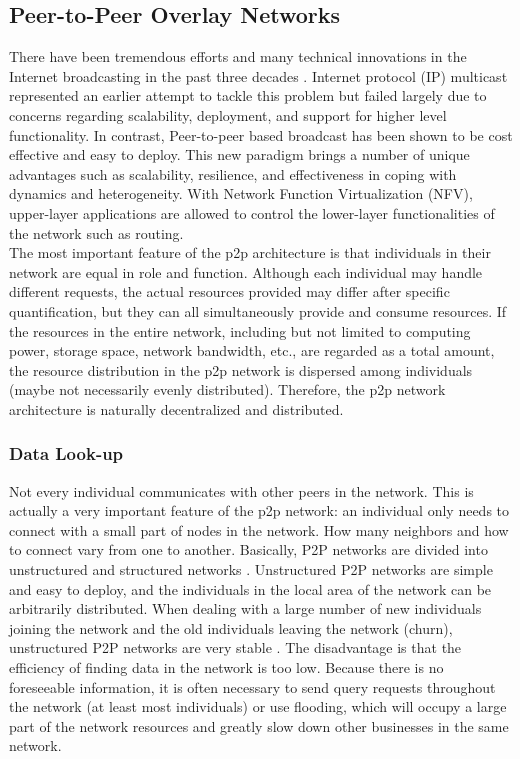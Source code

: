 \subsection{Peer-to-Peer Overlay Networks}

There have been tremendous efforts and many technical innovations in the Internet broadcasting in the past three decades \cite{liu2008opportunities}. Internet protocol (IP) multicast represented an earlier attempt to tackle this problem but failed largely due to concerns regarding scalability, deployment, and support for higher level functionality. In contrast, Peer-to-peer based broadcast has been shown to be cost effective and easy to deploy. This new paradigm brings a number of unique advantages such as scalability, resilience, and effectiveness in coping with dynamics and heterogeneity. With Network Function Virtualization (NFV), upper-layer applications are allowed to control the lower-layer functionalities of the network such as routing.\\
The most important feature of the p2p architecture is that individuals in their network are equal in role and function. Although each individual may handle different requests, the actual resources provided may differ after specific quantification, but they can all simultaneously provide and consume resources. If the resources in the entire network, including but not limited to computing power, storage space, network bandwidth, etc., are regarded as a total amount, the resource distribution in the p2p network is dispersed among individuals (maybe not necessarily evenly distributed). Therefore, the p2p network architecture is naturally decentralized and distributed.

\subsubsection{Data Look-up}

Not every individual communicates with other peers in the network. This is actually a very important feature of the p2p network: an individual only needs to connect with a small part of nodes in the network. How many neighbors and how to connect vary from one to another. Basically, P2P networks are divided into unstructured and structured networks \cite{qiu2007towards}. Unstructured P2P networks are simple and easy to deploy, and the individuals in the local area of ​​the network can be arbitrarily distributed. When dealing with a large number of new individuals joining the network and the old individuals leaving the network (churn), unstructured P2P networks are very stable \cite{stutzbach2006understanding}. The disadvantage is that the efficiency of finding data in the network is too low. Because there is no foreseeable information, it is often necessary to send query requests throughout the network (at least most individuals) or use flooding, which will occupy a large part of the network resources and greatly slow down other businesses in the same network.

